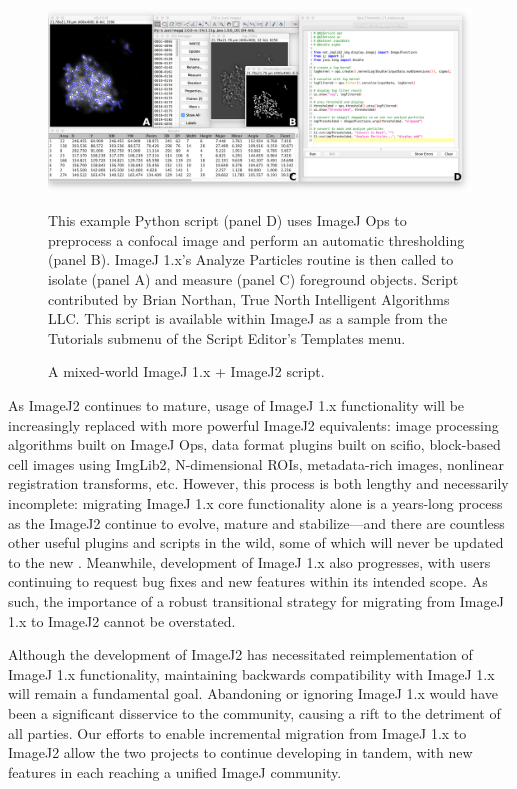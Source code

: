 \documentclass{bmcart}
\begin{document}
  \begin{figure}[h]
    \caption{A mixed-world ImageJ 1.x + ImageJ2 script.}
    \includegraphics[width=4.75in,natwidth=3324,natheight=1450]{figure-7/figure-labeled.png}
    \begin{flushleft}
      \footnotesize
      This example Python script (panel D) uses ImageJ Ops to preprocess a
      confocal image and perform an automatic thresholding (panel B). ImageJ
      1.x's Analyze Particles routine is then called to isolate (panel A) and
      measure (panel C) foreground objects. Script contributed by Brian
      Northan, True North Intelligent Algorithms LLC. This script is available
      within ImageJ as a sample from the Tutorials submenu of the Script
      Editor's Templates menu.
    \end{flushleft}
  \end{figure}

As ImageJ2 continues to mature, usage of ImageJ 1.x functionality will be
increasingly replaced with more powerful ImageJ2 equivalents: image processing
algorithms built on ImageJ Ops, data format plugins built on \acrshort{scifio},
block-based cell images using ImgLib2, N-dimensional ROIs, metadata-rich
images, nonlinear registration transforms, etc. However, this process is both
lengthy and necessarily incomplete: migrating ImageJ 1.x core functionality
alone is a years-long process as the ImageJ2  continue to
evolve, mature and stabilize---and there are countless other useful plugins and
scripts in the wild, some of which will never be updated to the new
. Meanwhile, development of ImageJ 1.x also progresses, with
users continuing to request bug fixes and new features within its intended
scope. As such, the importance of a robust transitional strategy for migrating
from ImageJ 1.x to ImageJ2 cannot be overstated.

Although the development of ImageJ2 has necessitated reimplementation of
ImageJ 1.x functionality, maintaining backwards compatibility with ImageJ 1.x
will remain a fundamental goal. Abandoning or ignoring ImageJ 1.x would have
been a significant disservice to the community, causing a rift to the detriment
of all parties. Our efforts to enable incremental migration from ImageJ 1.x to
ImageJ2 allow the two projects to continue developing in tandem, with new
features in each reaching a unified ImageJ community.
\end{document}
